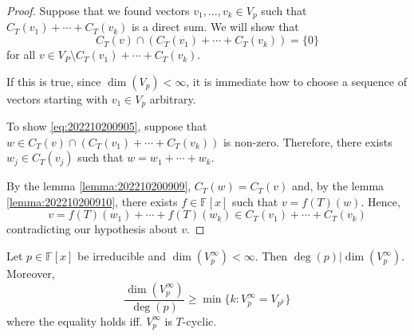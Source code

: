 \begin{proof}
	Suppose that we found vectors $v_1, \ldots, v_k \in V_p$ such that $C_T(v_1) + \cdots + C_T(v_k)$ is a direct sum. We will show that 
	\begin{equation}\label{eq:202210200905}
		C_T(v) \cap (C_T(v_1) + \cdots + C_T(v_k)) = \{ 0 \}
	\end{equation}
	for all $v \in V_P \setminus C_T(v_1) + \cdots + C_T(v_k)$. 

	If this is true, since $\dim (V_p) < \infty$, it is immediate how to choose a sequence of vectors starting with $v_1 \in V_p$ arbitrary. 

	To show \eqref{eq:202210200905}, suppose that $w \in C_T(v) \cap (C_T(v_1) + \cdots + C_T(v_k))$ is non-zero. Therefore, there exists $w_j \in C_T(v_j)$ such that $w = w_1 + \cdots + w_k$.

	By the lemma \ref{lemma:202210200909}, $C_T(w) = C_T(v)$ and, by the lemma \ref{lemma:202210200910}, there exists $f \in \mathbb{F}[x]$ such that $v = f(T)(w)$. Hence,
	\[
		v = f(T)(w_1) + \cdots + f(T)(w_k) \in C_T(v_1) + \cdots + C_T(v_k)
	\]
	contradicting our hypothesis about $v$.
\end{proof}

\begin{theorem}
	Let $p \in \mathbb{F}[x]$ be irreducible and $\dim (V_p^\infty) < \infty$. Then $\deg(p) | \dim (V_p^\infty)$. Moreover,
	\[
		\frac{\dim (V_p^\infty)}{\deg(p)} \geq \min \{ k : V_p^\infty = V_{p^k} \}
	\]
	where the equality holds iff. $V_p^\infty$ is $T$-cyclic.
\end{theorem}

